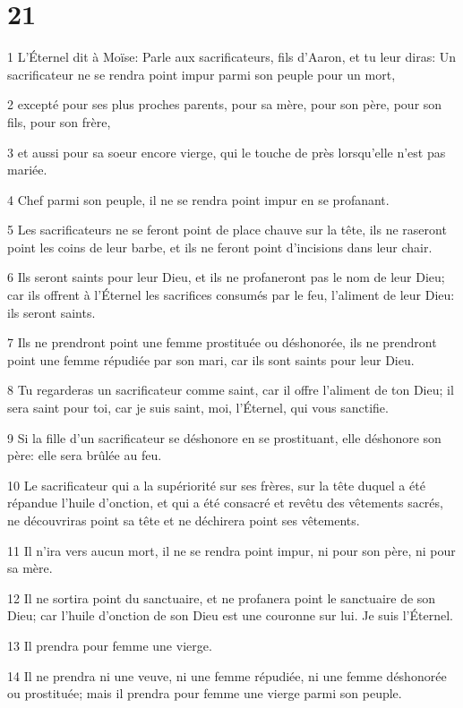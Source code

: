 \chapter{21}

\par 1 L'Éternel dit à Moïse: Parle aux sacrificateurs, fils d'Aaron, et tu leur diras: Un sacrificateur ne se rendra point impur parmi son peuple pour un mort,
\par 2 excepté pour ses plus proches parents, pour sa mère, pour son père, pour son fils, pour son frère,
\par 3 et aussi pour sa soeur encore vierge, qui le touche de près lorsqu'elle n'est pas mariée.
\par 4 Chef parmi son peuple, il ne se rendra point impur en se profanant.
\par 5 Les sacrificateurs ne se feront point de place chauve sur la tête, ils ne raseront point les coins de leur barbe, et ils ne feront point d'incisions dans leur chair.
\par 6 Ils seront saints pour leur Dieu, et ils ne profaneront pas le nom de leur Dieu; car ils offrent à l'Éternel les sacrifices consumés par le feu, l'aliment de leur Dieu: ils seront saints.
\par 7 Ils ne prendront point une femme prostituée ou déshonorée, ils ne prendront point une femme répudiée par son mari, car ils sont saints pour leur Dieu.
\par 8 Tu regarderas un sacrificateur comme saint, car il offre l'aliment de ton Dieu; il sera saint pour toi, car je suis saint, moi, l'Éternel, qui vous sanctifie.
\par 9 Si la fille d'un sacrificateur se déshonore en se prostituant, elle déshonore son père: elle sera brûlée au feu.
\par 10 Le sacrificateur qui a la supériorité sur ses frères, sur la tête duquel a été répandue l'huile d'onction, et qui a été consacré et revêtu des vêtements sacrés, ne découvriras point sa tête et ne déchirera point ses vêtements.
\par 11 Il n'ira vers aucun mort, il ne se rendra point impur, ni pour son père, ni pour sa mère.
\par 12 Il ne sortira point du sanctuaire, et ne profanera point le sanctuaire de son Dieu; car l'huile d'onction de son Dieu est une couronne sur lui. Je suis l'Éternel.
\par 13 Il prendra pour femme une vierge.
\par 14 Il ne prendra ni une veuve, ni une femme répudiée, ni une femme déshonorée ou prostituée; mais il prendra pour femme une vierge parmi son peuple.
